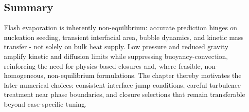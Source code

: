 \subsection{Summary}
Flash evaporation is inherently non-equilibrium: accurate prediction hinges on nucleation seeding, 
transient interfacial area, bubble dynamics, and kinetic mass transfer - not solely 
on bulk heat supply. Low pressure and reduced gravity 
amplify kinetic and diffusion limits while suppressing 
buoyancy-convection, reinforcing the need for physics-based closures and, 
where feasible, non-homogeneous, non-equilibrium formulations. 
The chapter thereby motivates the later numerical choices: consistent 
interface jump conditions, careful turbulence treatment near 
phase boundaries, and closure selections that remain transferable beyond case-specific tuning.





